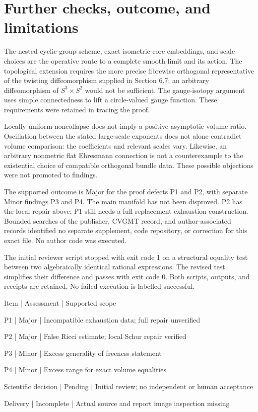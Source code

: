 \documentclass[10pt]{article}
\begin{document}
\section*{Further checks, outcome, and limitations}
The nested cyclic-group scheme, exact isometric-core embeddings, and scale choices are the operative route to a complete smooth limit and its action. The topological extension requires the more precise fibrewise orthogonal representative of the twisting diffeomorphism supplied in Section 6.7; an arbitrary diffeomorphism of \(S^3\times S^2\) would not be sufficient. The gauge-isotopy argument uses simple connectedness to lift a circle-valued gauge function. These requirements were retained in tracing the proof.\par
Locally uniform noncollapse does not imply a positive asymptotic volume ratio. Oscillation between the stated large-scale exponents does not alone contradict volume comparison: the coefficients and relevant scales vary. Likewise, an arbitrary nonmetric flat Ehresmann connection is not a counterexample to the existential choice of compatible orthogonal bundle data. These possible objections were not promoted to findings.\par
The supported outcome is Major for the proof defects P1 and P2, with separate Minor findings P3 and P4. The main manifold has not been disproved. P2 has the local repair above; P1 still needs a full replacement exhaustion construction. Bounded searches of the publisher, CVGMT record, and author-associated records identified no separate supplement, code repository, or correction for this exact file. No author code was executed.\par
The initial reviewer script stopped with exit code 1 on a structural equality test between two algebraically identical rational expressions. The revised test simplifies their difference and passes with exit code 0. Both scripts, outputs, and receipts are retained. No failed execution is labelled successful.\par
Item | Assessment | Supported scope\par
P1 | Major | Incompatible exhaustion data; full repair unverified\par
P2 | Major | False Ricci estimate; local Schur repair verified\par
P3 | Minor | Excess generality of freeness statement\par
P4 | Minor | Excess range for exact volume equalities\par
Scientific decision | Pending | Initial review; no independent or human acceptance\par
Delivery | Incomplete | Actual source and report image inspection missing\par
\end{document}
